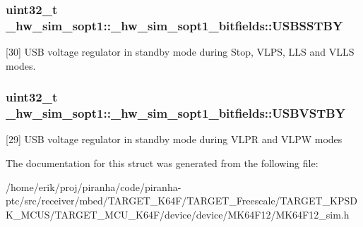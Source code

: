 \subsubsection[{\texorpdfstring{U\+S\+B\+S\+S\+T\+BY}{USBSSTBY}}]{\setlength{\rightskip}{0pt plus 5cm}uint32\+\_\+t \+\_\+hw\+\_\+sim\+\_\+sopt1\+::\+\_\+hw\+\_\+sim\+\_\+sopt1\+\_\+bitfields\+::\+U\+S\+B\+S\+S\+T\+BY}\hypertarget{struct__hw__sim__sopt1_1_1__hw__sim__sopt1__bitfields_ae3f98afce8baf30245c4c14e2e4b900d}{}\label{struct__hw__sim__sopt1_1_1__hw__sim__sopt1__bitfields_ae3f98afce8baf30245c4c14e2e4b900d}
\mbox{[}30\mbox{]} U\+SB voltage regulator in standby mode during Stop, V\+L\+PS, L\+LS and V\+L\+LS modes. 
\subsubsection[{\texorpdfstring{U\+S\+B\+V\+S\+T\+BY}{USBVSTBY}}]{\setlength{\rightskip}{0pt plus 5cm}uint32\+\_\+t \+\_\+hw\+\_\+sim\+\_\+sopt1\+::\+\_\+hw\+\_\+sim\+\_\+sopt1\+\_\+bitfields\+::\+U\+S\+B\+V\+S\+T\+BY}\hypertarget{struct__hw__sim__sopt1_1_1__hw__sim__sopt1__bitfields_ad06eec8135d0d6262e93a55795ad8b07}{}\label{struct__hw__sim__sopt1_1_1__hw__sim__sopt1__bitfields_ad06eec8135d0d6262e93a55795ad8b07}
\mbox{[}29\mbox{]} U\+SB voltage regulator in standby mode during V\+L\+PR and V\+L\+PW modes 

The documentation for this struct was generated from the following file\+:\begin{DoxyCompactItemize}
\item 
/home/erik/proj/piranha/code/piranha-\/ptc/src/receiver/mbed/\+T\+A\+R\+G\+E\+T\+\_\+\+K64\+F/\+T\+A\+R\+G\+E\+T\+\_\+\+Freescale/\+T\+A\+R\+G\+E\+T\+\_\+\+K\+P\+S\+D\+K\+\_\+\+M\+C\+U\+S/\+T\+A\+R\+G\+E\+T\+\_\+\+M\+C\+U\+\_\+\+K64\+F/device/device/\+M\+K64\+F12/M\+K64\+F12\+\_\+sim.\+h\end{DoxyCompactItemize}
